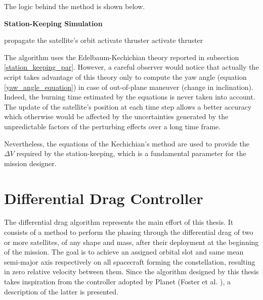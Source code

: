 \begin{itemize}
The logic behind the method is shown below.
\begin{algorithm}[H]
      \caption{\textbf{Station-Keeping Simulation}}
      \begin{algorithmic}[1]
                        \State propagate the satellite's orbit
                                \State activate thruster
                            \EndWhile
                        \EndIf           
                                \State activate thruster
                            \EndWhile
                    \EndIf
                  \EndFor
            \EndProcedure
      \end{algorithmic}
\end{algorithm}

The algorithm uses the Edelbaum-Kechichian theory reported in subsection \ref{station_keeping_par}.
However, a careful observer would notice that actually the script takes advantage of this theory only to compute the yaw angle (equation \ref{yaw_angle_equation}) in case of out-of-plane maneuver (change in inclination).
Indeed, the burning time estimated by the equations is never taken into account.
The update of the satellite's position at each time step allows a better accuracy which otherwise would be affected by the uncertainties generated by the unpredictable factors of the perturbing effects over a long time frame.

Nevertheless, the equations of the Kechichian's method are used to provide the $\Delta V$ required by the station-keeping, which is a fundamental parameter for the mission designer.


\section{Differential Drag Controller} \label{differential_drag_control_par}
The differential drag algorithm represents the main effort of this thesis.
It consists of a method to perform the phasing through the differential drag of two or more satellites, of any shape and mass, after their deployment at the beginning of the mission.
The goal is to achieve an assigned orbital slot and same mean semi-major axis respectively on all spacecraft forming the constellation, resulting in zero relative velocity between them.
Since the algorithm designed by this thesis takes inspiration from the controller adopted by Planet (Foster et al. \cite{foster2015orbit}), a description of the latter is presented.


\end{itemize}
